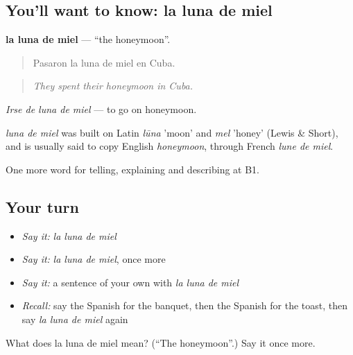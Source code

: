 \subsection*{You'll want to know: la luna de miel}
\textbf{la luna de miel} — \textquotedblleft{}the honeymoon\textquotedblright{}.

\begin{quote}
Pasaron la luna de miel en Cuba.
\end{quote}

\begin{quote}
\emph{They spent their honeymoon in Cuba.}
\end{quote}

\emph{Irse de luna de miel} — to go on honeymoon.

\begin{cousinweb}
\emph{luna de miel} was built on Latin \emph{lūna} 'moon' and \emph{mel} 'honey' (Lewis \& Short), and is usually said to copy English \emph{honeymoon}, through French \emph{lune de miel}.
\end{cousinweb}

\begin{grammarlens}[title={What you've built}]
One more word for telling, explaining and describing at B1.
\end{grammarlens}

\subsection*{Your turn}
\begin{itemize}
\raggedright
  \item \emph{Say it:} \emph{la luna de miel}
  \item \emph{Say it:} \emph{la luna de miel}, once more
  \item \emph{Say it:} a sentence of your own with \emph{la luna de miel}
  \item \emph{Recall:} say the Spanish for the banquet, then the Spanish for the toast, then say \emph{la luna de miel} again
\end{itemize}

\begin{tcolorbox}[breakable,colback=teal!4,colframe=teal!35!black,title={Before you move on}]
What does la luna de miel mean? (\textquotedblleft{}The honeymoon\textquotedblright{}.) Say it once more.
\end{tcolorbox}

